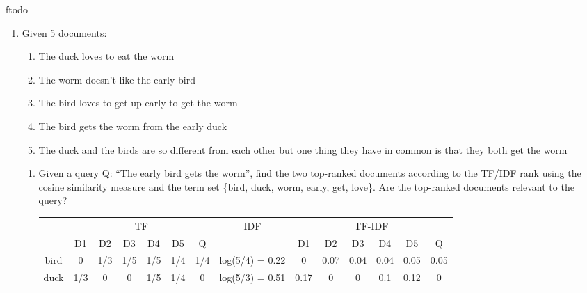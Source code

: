ƒtodo\documentclass{article}
\newenvironment{QandA}{\begin{enumerate}[label=\arabic*.]}{\end{enumerate}}
\newenvironment{InnerQandA}{\begin{enumerate}[label=\roman*.]}{\end{enumerate}}
\begin{document}
\begin{QandA}
    \item Given 5 documents:
    \begin{enumerate}[label=D\arabic*:]
        \item The duck loves to eat the worm
        \item The worm doesn’t like the early bird
        \item The bird loves to get up early to get the worm
        \item The bird gets the worm from the early duck
        \item The duck and the birds are so different from each other but one thing they have in common is that they both get the worm
    \end{enumerate}
    \begin{InnerQandA}
        \item Given a query Q: ``The early bird gets the worm'', find the two top-ranked documents according to the TF/IDF rank using the cosine similarity measure and the term set \{bird, duck, worm, early, get, love\}. Are the top-ranked documents relevant to the query?
        \begin{table}[h!]
            \centering
            \begin{tabular}{|c|cccccc|c|cccccc|}
            \hline
            \multirow{2}{*}{} & \multicolumn{6}{c|}{TF}                                                                                                                    & \multirow{2}{*}{IDF} & \multicolumn{6}{c|}{TF-IDF}                                                                                                                      \\ \cline{2-7} \cline{9-14} 
                              & \multicolumn{1}{c|}{D1}  & \multicolumn{1}{c|}{D2}  & \multicolumn{1}{c|}{D3}  & \multicolumn{1}{c|}{D4}  & \multicolumn{1}{c|}{D5}  & Q   &                      & \multicolumn{1}{c|}{D1}   & \multicolumn{1}{c|}{D2}   & \multicolumn{1}{c|}{D3}   & \multicolumn{1}{c|}{D4}   & \multicolumn{1}{c|}{D5}   & Q    \\ \hline
            bird              & \multicolumn{1}{c|}{0}   & \multicolumn{1}{c|}{1/3} & \multicolumn{1}{c|}{1/5} & \multicolumn{1}{c|}{1/5} & \multicolumn{1}{c|}{1/4} & 1/4 & log(5/4) = 0.22      & \multicolumn{1}{c|}{0}    & \multicolumn{1}{c|}{0.07} & \multicolumn{1}{c|}{0.04} & \multicolumn{1}{c|}{0.04} & \multicolumn{1}{c|}{0.05} & 0.05 \\ \hline
            duck              & \multicolumn{1}{c|}{1/3} & \multicolumn{1}{c|}{0}   & \multicolumn{1}{c|}{0}   & \multicolumn{1}{c|}{1/5} & \multicolumn{1}{c|}{1/4} & 0   & log(5/3) = 0.51      & \multicolumn{1}{c|}{0.17} & \multicolumn{1}{c|}{0}    & \multicolumn{1}{c|}{0}    & \multicolumn{1}{c|}{0.1}  & \multicolumn{1}{c|}{0.12} & 0    \\ \hline

\end{tabular}
\end{table}
\end{InnerQandA}
\end{QandA}
\end{document}
